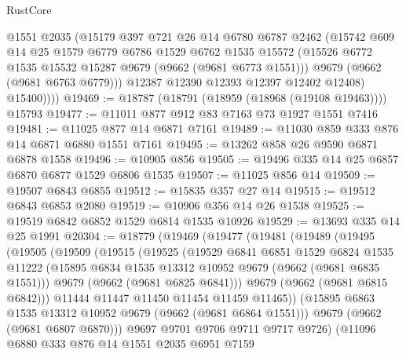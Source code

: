 \begin{lexlean}{RustCore}
\begin{coremodule}
            @1551
            @2035
            (@15179
              @397
              @721
              @26
              @14
              @6780
              @6787
              @2462
              (@15742
                @609
                @14
                @25
                @1579
                @6779
                @6786
                @1529
                @6762
                @1535
                @15572
                (@15526 @6772 @1535 @15532 @15287 @9679 (@9662 (@9681 @6773 @1551)))
                @9679
                (@9662 (@9681 @6763 @6779)))
              @12387
              @12390
              @12393
              @12397
              @12402
              @12408)
            @15400))))
@19469 := @18787 (@18791 (@18959 (@18968 (@19108 @19463)))) @15793
@19477 := @11011 @877 @912 @83 @7163 @73 @1927 @1551 @7416
@19481 := @11025 @877 @14 @6871 @7161
@19489 := @11030 @859 @333 @876 @14 @6871 @6880 @1551 @7161
@19495 := @13262 @858 @26 @9590 @6871 @6878 @1558
@19496 := @10905 @856
@19505 := @19496 @335 @14 @25 @6857 @6870 @6877 @1529 @6806 @1535
@19507 := @11025 @856 @14
@19509 := @19507 @6843 @6855
@19512 := @15835 @357 @27 @14
@19515 := @19512 @6843 @6853 @2080
@19519 := @10906 @356 @14 @26 @1538
@19525 := @19519 @6842 @6852 @1529 @6814 @1535 @10926
@19529 := @13693 @335 @14 @25 @1991
@20304 := @18779
    (@19469
      (@19477
        (@19481
          (@19489
            (@19495
              (@19505
                (@19509
                  (@19515
                    (@19525
                      (@19529
                        @6841
                        @6851
                        @1529
                        @6824
                        @1535
                        @11222
                        (@15895 @6834 @1535 @13312 @10952 @9679 (@9662 (@9681 @6835 @1551)))
                        @9679
                        (@9662 (@9681 @6825 @6841)))
                      @9679
                      (@9662 (@9681 @6815 @6842)))
                    @11444
                    @11447
                    @11450
                    @11454
                    @11459
                    @11465))
                (@15895 @6863 @1535 @13312 @10952 @9679 (@9662 (@9681 @6864 @1551)))
                @9679
                (@9662 (@9681 @6807 @6870)))
              @9697
              @9701
              @9706
              @9711
              @9717
              @9726)
            (@11096
              @6880
              @333
              @876
              @14
              @1551
              @2035
              @6951
              @7159

\end{coremodule}
\end{lexlean}
